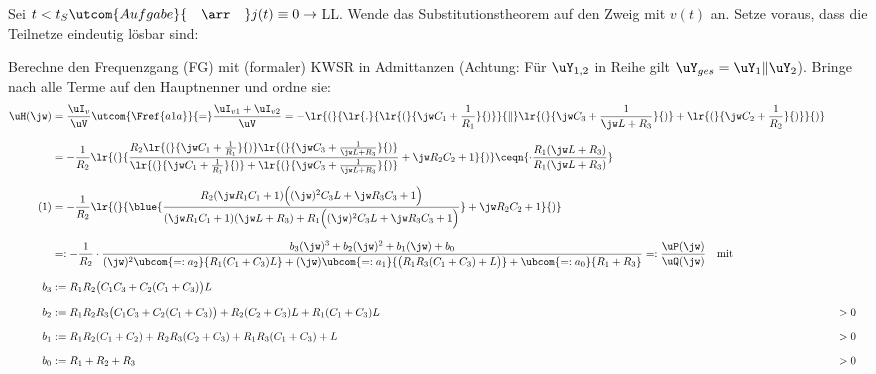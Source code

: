 %
\newcommand{\defaultPath}{/docs/LaTeX_Def/}




%
\allowdisplaybreaks
\reversemarginpar
\newcommand{\numberthis}[1]{%
	\stepcounter{equation}\tag{\theequation}\label{#1}%
}%
%
%
Sei $t<t_S\utcom{Aufgabe}{\quad\arr\quad} j(t)\equiv0\rightarrow\:$LL. Wende das Substitutionstheorem auf den Zweig mit $v(t)$ an. Setze voraus, dass die Teilnetze eindeutig lösbar sind:
%

\noindent Berechne den Frequenzgang (FG) mit (formaler) KWSR in Admittanzen (Achtung: Für $\uY_{1,2}$ in Reihe gilt $\uY_{ges}=\uY_1\|\uY_2$). Bringe nach  alle Terme auf den Hauptnenner und ordne sie:
%
\begin{align*}
	\uH(\jw)&=\frac{\uI_v}{\uV}\utcom{\Fref{a1a}}{=}\frac{\uI_{v1}+\uI_{v2}}{\uV}=-\lr{(}{%
		\lr{.}{\lr{(}{%
			\jw C_1+\frac{1}{R_1}%
		}{)}}{\|}\lr{(}{%
			\jw C_3+\frac{1}{\jw L + R_3}%
		}{)}+\lr{(}{%
			\jw C_2+\frac{1}{R_2}%
		}{)}%
	}{)}\\[2.5mm]%
%
	&=-\frac{1}{R_2}\lr{(}{%
		\frac{%
			R_2\lr{(}{%
				\jw C_1+\frac{1}{R_1}%
			}{)}\lr{(}{%
				\jw C_3+\frac{1}{\jw L + R_3}%
			}{)}%
		}{%
			\lr{(}{%
				\jw C_1+\frac{1}{R_1}%
			}{)} + \lr{(}{%
				\jw C_3+\frac{1}{\jw L + R_3}%
			}{)}%
		} + \jw R_2C_2+1%
	}{)}\ceqn{%
		\cdot\frac{R_1(\jw L+R_3)}{R_1(\jw L+R_3)}%
	}\\[2.5mm]%
%
	\numberthis{a1a_FG_mult}&=-\frac{1}{R_2}\lr{(}{%
		\blue{\frac{%
			R_2(\jw R_1C_1+1)\Bigl((\jw)^2C_3L+\jw R_3C_3+1\Bigr)%
		}{%
			(\jw R_1C_1+1)(\jw L+R_3)+R_1\Bigl((\jw)^2C_3L+\jw R_3C_3+1\Bigr)%
		}} + \jw R_2C_2+1%
	}{)}\\[2.5mm]%
%
	&=:-\frac{1}{R_2}\cdot\frac{%
		b_3(\jw)^3+b_2(\jw)^2+b_1(\jw) +b_0%
	}{%
		(\jw)^2\ubcom{=:a_2}{%
			R_1(C_1+C_3)L%
		}+(\jw)\ubcom{=:a_1}{%
			\bigl(R_1R_3(C_1+C_3)+L\bigr)%
		}+\ubcom{=:a_0}{R_1+R_3}%
	}=:\frac{\uP(\jw)}{\uQ(\jw)}\quad\text{mit}\\[2.5mm]%
%
	b_3&:=R_1R_2\bigl(C_1C_3+C_2(C_1+C_3)\bigr)L&&\\[2.5mm]%
	b_2&:=R_1R_2R_3\bigl(C_1C_3+C_2(C_1+C_3)\bigr)+R_2(C_2+C_3)L+R_1(C_1+C_3)L&&>0\\[2.5mm]%
	b_1&:=R_1R_2(C_1+C_2)+R_2R_3(C_2+C_3)+R_1R_3(C_1+C_3)+L&&>0\\[2.5mm]%
	b_0&:=R_1+R_2+R_3&&>0%
\end{align*}%


